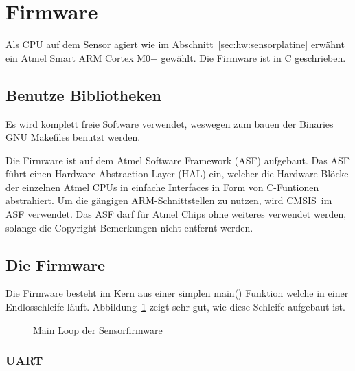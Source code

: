 \section{Firmware \Sensor}
\label{sec:firmware:sensor}

Als  CPU auf  dem  Sensor agiert  wie im  Abschnitt~\ref{sec:hw:sensorplatine}
erw\"ahnt ein  Atmel Smart ARM  Cortex M0+ gew\"ahlt.   Die Firmware ist  in C
geschrieben.

\subsection{Benutze Bibliotheken}

Es wird komplett freie Software verwendet, weswegen zum bauen der Binaries GNU
Makefiles benutzt werden.

Die  Firmware  ist  auf  dem Atmel  Software  Framework  (ASF)  aufgebaut. Das
ASF  f\"uhrt  einen   Hardware  Abstraction  Layer  (HAL)   ein,  welcher  die
Hardware-Bl\"ocke der einzelnen Atmel CPUs  in einfache Interfaces in Form von
C-Funtionen abstrahiert. Um die g\"angigen  ARM-Schnittstellen zu nutzen, wird
CMSIS im  ASF  verwendet. Das  ASF  darf  f\"ur  Atmel  Chips  ohne  weiteres
verwendet werden, solange die Copyright Bemerkungen nicht entfernt werden.

\subsection{Die Firmware}

Die Firmware besteht im Kern aus einer simplen main() Funktion welche in einer
Endlosschleife l\"auft. Abbildung~\ref{fig:sensor:firmware:mainloop} zeigt sehr gut, wie diese Schleife aufgebaut ist.

\begin{figure}[h!tb]

\caption{Main Loop der Sensorfirmware}
\label{fig:sensor:firmware:mainloop}
\end{figure}

\subsubsection{UART}
\label{subs:UART}

